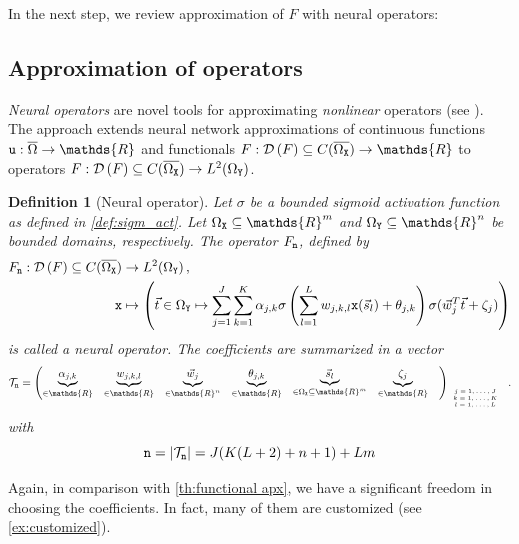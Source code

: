 \documentclass[10pt]{article}
\numberwithin{equation}{section}
\newtheorem{definition}[definition]{Definition}
\theoremstyle{nonumberplain}
\newcommand{\R}{\mathds{R}}
\newcommand{\dom}[1]{\mathcal{D}\left(#1\right)}
\newcommand{\abs}[1]{\left|#1\right|}
\newcommand{\bs}{\vec{s}}
\newcommand{\bt}{\vec{t}}
\newcommand{\bw}{{\vec{w}}}
\newcommand{\X}{{\tt X}}
\newcommand{\Y}{{\tt Y}}
\newcommand{\n}{{\tt n}}
\begin{document}
In the next step, we review approximation of $F$ with neural operators:
\subsection{Approximation of operators}
\emph{Neural operators} are novel tools for approximating \emph{nonlinear} operators (see \cite{LuJinPanZhaKar21}). The approach extends neural network approximations of continuous functions ${\tt u}: \overline{\Omega} \to \R$ and functionals $F: \dom{F} \subseteq C(\overline{\Omega_\X}) \to \R$ to operators $F: \dom{F} \subseteq C(\overline{\Omega_\X}) \to L^2(\Omega_\Y)$.

\begin{definition}[Neural operator] \label{de:deeponet} 
	Let $\sigma$ be a bounded sigmoid activation function as defined in \autoref{def:sigm_act}. 
	Let $\Omega_\X \subseteq \R^m$ and 
	$\Omega_\Y \subseteq \R^n$ be bounded domains, respectively.
	The operator $F_\n$, defined by
\begin{equation} \label{eq:deeponet}
	\begin{aligned}
		F_\n: \dom{F} \subseteq C(\overline{\Omega_\X}) &\to L^2(\Omega_\Y)\,,\\
		{\tt x} &\mapsto \left( \bt \in \Omega_\Y \mapsto \sum_{j=1}^{J} \sum_{k=1}^{K} \alpha_{j,k} \sigma \left( \sum_{l=1}^{L} w_{j,k,l} {\tt x}(\bs_l)+\theta_{j,k}\right) \sigma (\bw_j^T \bt +\zeta_j) \right)
	\end{aligned}
\end{equation}
is called a \emph{neural operator}. 
The coefficients are summarized in a vector
\begin{equation}\label{eq:D}
\mathcal{T}_\n = \begin{pmatrix} \underbrace{ \alpha_{j,k}}_{\in \R} & \underbrace{ w_{j,k,l}}_{\in \R} & \underbrace{ \bw_j}_{\in \R^n} & \underbrace{ \theta_{j,k}}_{\in \R} & \underbrace{ \bs_l}_{\in \Omega_\X \subseteq \R^m} 
	& \underbrace{ \zeta_j}_{\in \R} &\end{pmatrix}_{\tiny \begin{array}{c} j=1,\dots,J\\ k=1,\dots,K\\ l=1,\dots,L \end{array}} \;.
	\end{equation}
	with 
	\begin{equation*}
	\n = \abs{\mathcal{T}_\n} = 
	J(K(L + 2) + n + 1) + Lm
	\end{equation*}
\end{definition}
Again, in comparison with \autoref{th:functional apx}, we have a significant freedom in choosing the coefficients. In fact, many of them are customized (see \autoref{ex:customized}).
\end{document}
